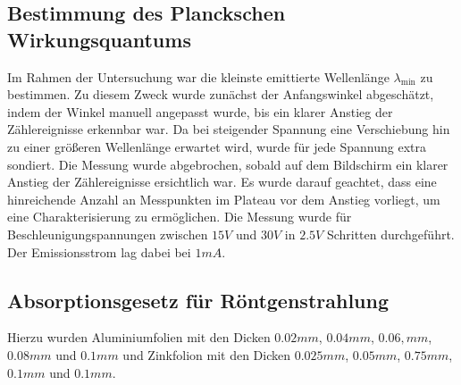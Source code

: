 \subsection{Bestimmung des Planckschen Wirkungsquantums}

Im Rahmen der Untersuchung war die kleinste emittierte Wellenlänge $\lambda_\mathrm{min}$ zu bestimmen. Zu diesem Zweck wurde zunächst der Anfangswinkel abgeschätzt, indem der Winkel manuell angepasst wurde, bis ein klarer Anstieg der Zählereignisse erkennbar war. Da bei steigender Spannung eine Verschiebung hin zu einer größeren Wellenlänge erwartet wird, wurde für jede Spannung extra sondiert. Die Messung wurde abgebrochen, sobald auf dem Bildschirm ein klarer Anstieg der Zählereignisse ersichtlich war. Es wurde darauf geachtet, dass eine hinreichende Anzahl an Messpunkten im Plateau vor dem Anstieg vorliegt, um eine Charakterisierung zu ermöglichen.  Die Messung wurde für Beschleunigungspannungen zwischen $15 \unit{V}$ und $30 \unit{V}$ in $2.5 \unit{V}$ Schritten durchgeführt. Der Emissionsstrom lag dabei bei $1 \unit{mA}$. 

\subsection{Absorptionsgesetz für Röntgenstrahlung}
Hierzu wurden Aluminiumfolien mit den Dicken $0.02 \unit{mm}$, $0.04 \unit{mm}$, $0.06,  \unit{mm}$, $0.08 \unit{mm}$ und $0.1 \unit{mm}$ und Zinkfolion mit den Dicken $0.025 \unit{mm}$, $0.05 \unit{mm}$, $0.75 \unit{mm}$, $0.1 \unit{mm}$ und $0.1 \unit{mm}$. 